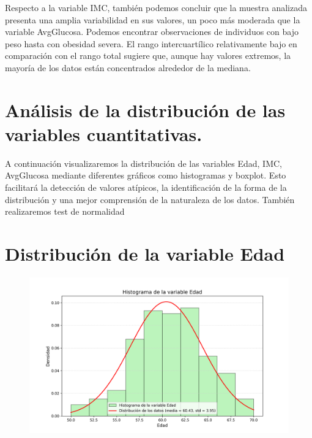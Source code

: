 \documentclass[a4paper, 12pt]{article}
\begin{document}
Respecto a la variable IMC, también podemos concluir que la muestra analizada presenta una amplia variabilidad en sus valores, un poco más moderada que la variable AvgGlucosa. Podemos encontrar observaciones 
de individuos con bajo peso hasta con obesidad severa. El rango intercuartílico relativamente bajo en comparación 
con el rango total sugiere que, aunque hay valores extremos, la mayoría de los datos están concentrados alrededor de la 
mediana.




\newpage



\section{Análisis de la distribución de las variables cuantitativas.}
A continuación visualizaremos la distribución de las variables Edad, IMC, AvgGlucosa mediante diferentes gráficos como histogramas y boxplot.
Esto facilitará la detección de valores atípicos, la identificación de la forma de la distribución y una mejor comprensión de la naturaleza 
de los datos. También realizaremos test de normalidad


\section{Distribución de la variable Edad}

\begin{figure}[H]
    \centering
    \includegraphics[width=1\textwidth]{img/Histogramas/Histograma_Edad.png}
\end{figure}
\end{document}
